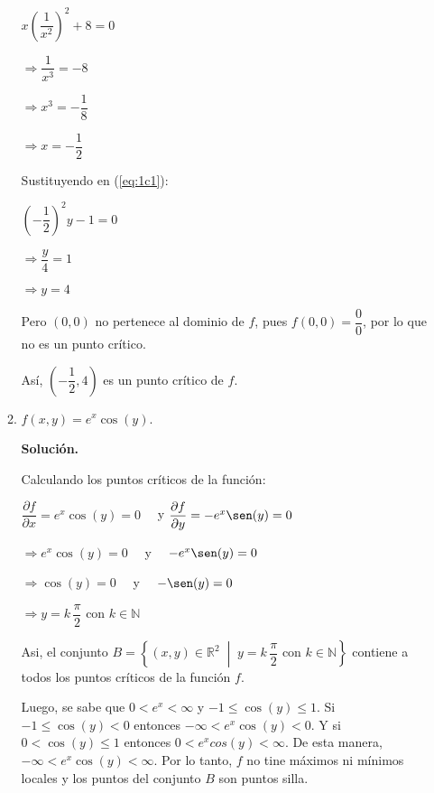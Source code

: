 \documentclass[fleqn, 12pt]{article}
\newcommand{\derivadaparcial}[2]{\dfrac{\partial {#1}}{\partial {#2}}}
\newcommand{\talque}{\; \middle | \;}
\begin{document}
\begin{enumerate}
\begin{enumerate}
            $ x \left( \dfrac{1}{x^2} \right)^2 + 8 = 0 $

            $ \Longrightarrow \dfrac{1}{x^3} = -8 $

            $ \Longrightarrow x^3 = -\dfrac{1}{8} $

            $ \Longrightarrow x = -\dfrac{1}{2} $

            Sustituyendo en (\ref{eq:1c1}): 

            $ \left( -\dfrac{1}{2} \right)^2 y - 1 = 0 $

            $ \Longrightarrow \dfrac{y}{4} = 1 $

            $ \Longrightarrow y = 4 $

            Pero $ (0,0) $ no pertenece al dominio de $ f $, pues $ f(0,0) = \dfrac{0}{0} $, por lo que no es un punto crítico.

            Así, $ \left( -\dfrac{1}{2}, 4 \right) $ es un punto crítico de $ f $.

            \item $ f(x,y) = e^x \cos (y) $.
            
            \textbf{Solución.}

            Calculando los puntos críticos de la función:

            $ \derivadaparcial{f}{x} = e^x \cos (y) = 0 \quad $ y $ \derivadaparcial{f}{y} = -e^x \sen (y) = 0 $

            $ \Longrightarrow e^x \cos (y) = 0 \quad $ y $ \quad -e^x \sen (y) = 0 $

            $ \Longrightarrow \cos (y) = 0 \quad $ y $ \quad - \sen (y) = 0 $

            $ \Longrightarrow y = k \, \dfrac{\pi}{2} $ con $ k \in \mathbb{N} $

            Asi, el conjunto $ B = \left\lbrace (x,y) \in \mathbb{R}^2 \talque y = k \, \dfrac{\pi}{2} \text{ con } k \in \mathbb{N} \right\rbrace $ contiene a todos los puntos críticos de la función $ f $.

            Luego, se sabe que $ 0 < e^x < \infty $ y $ -1 \leq \cos (y) \leq 1 $. Si $ -1 \leq \cos (y) < 0 $ entonces $ - \infty < e^x \cos (y) < 0 $. Y si $ 0 < \cos (y) \leq 1 $ entonces $ 0 < e^x cos(y) < \infty $. De esta manera, $ - \infty < e^x \cos (y) < \infty $. Por lo tanto, $ f $ no tine máximos ni mínimos locales y los puntos del conjunto $ B $ son puntos silla.


\end{enumerate}
\end{enumerate}
\end{document}
